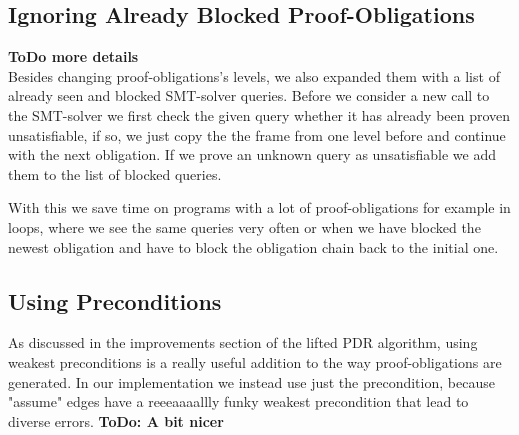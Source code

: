 \documentclass[11pt, a4paper, BCOR=10mm, ngerman, oneside]{scrbook}
\begin{document}
\begin{figure}[H]
\end{figure}
 

\subsection{Ignoring Already Blocked Proof-Obligations}
\textbf{ToDo more details} \\
Besides changing proof-obligations's levels, we also expanded them with a list of already seen and blocked SMT-solver queries. Before we consider a new call to the SMT-solver we first check the given query whether it has already been proven unsatisfiable, if so, we just copy the the frame from one level before and continue with the next obligation. If we prove an unknown query as unsatisfiable we add them to the list of blocked queries. \par
With this we save time on programs with a lot of proof-obligations for example in loops, where we see the same queries very often or when we have blocked the newest obligation and have to block the obligation chain back to the initial one.

\subsection{Using Preconditions}
As discussed in the improvements section of the lifted PDR algorithm, using weakest preconditions is a really useful addition to the way proof-obligations are generated. In our implementation we instead use just the precondition, because "assume" edges have a reeeaaaallly funky weakest precondition that lead to diverse errors.
\textbf{ToDo: A bit nicer}
\end{document}
